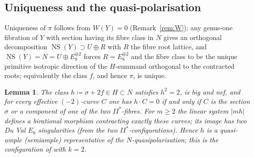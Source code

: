 \documentclass[11pt]{article}
\newtheorem{lemma}[theorem]{Lemma}
\DeclareMathOperator{\NS}{NS}
\begin{document}
\subsection{Uniqueness and the quasi-polarisation}

Uniqueness of $\pi$ follows from $W(Y)=0$ (Remark~\ref{rem:W}): any
genus-one fibration of $Y$ with section having its fibre class in $N$ gives
an orthogonal decomposition $\NS(Y)\supset U\oplus R$ with $R$ the fibre
root lattice, and $\NS(Y)=N=U\oplus E_8^{\oplus2}$ forces $R=E_8^{\oplus2}$
and the fibre class to be the unique primitive isotropic direction of the
$H$-summand orthogonal to the contracted roots; equivalently the class $f$,
and hence $\pi$, is unique.

\begin{lemma}\label{lem:quasi}
The class $h\coloneqq\sigma+2f\in H\subset N$ satisfies $h^2=2$, is big and
nef, and for every effective $(-2)$-curve $C$ one has $h\cdot C=0$ if and
only if $C$ is the section $\sigma$ or a component of one of the two
$II^*$-fibres. For $m\ge 2$ the linear system $|mh|$ defines a birational
morphism contracting exactly these curves; its image has two Du Val $E_8$
singularities (from the two $II^*$-configurations). Hence $h$ is a
quasi-ample (semiample) representative of the $N$-quasipolarisation; this
is the configuration of {} with $k=2$.
\end{lemma}
\end{document}
